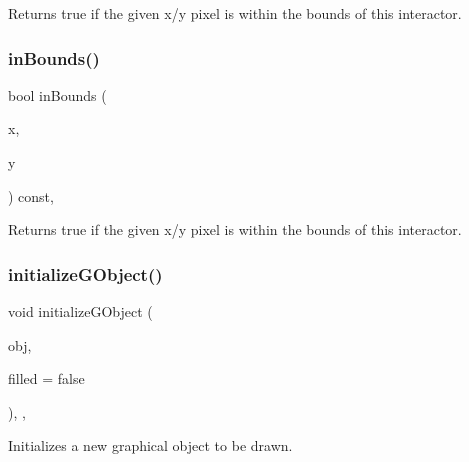 Returns true if the given x/y pixel is within the bounds of this interactor. 

\mbox{\label{classsgl_1_1GInteractor_ae6d7982c1c627b677a5e776ca86118ed}} 
\subsubsection{\texorpdfstring{in\+Bounds()}{inBounds()}\hspace{0.1cm}{\footnotesize\ttfamily [2/2]}}
{\footnotesize\ttfamily bool in\+Bounds (\begin{DoxyParamCaption}\item[{int}]{x,  }\item[{int}]{y }\end{DoxyParamCaption}) const\hspace{0.3cm}{\ttfamily [virtual]}, {\ttfamily [inherited]}}



Returns true if the given x/y pixel is within the bounds of this interactor. 

\mbox{\label{classsgl_1_1GDrawingSurface_a814498efebc5586645159cd22990cf61}} 
\subsubsection{\texorpdfstring{initialize\+G\+Object()}{initializeGObject()}\hspace{0.1cm}{\footnotesize\ttfamily [1/2]}}
{\footnotesize\ttfamily void initialize\+G\+Object (\begin{DoxyParamCaption}\item[{\mbox{\hyperlink{classsgl_1_1GObject}{G\+Object}} \&}]{obj,  }\item[{bool}]{filled = {\ttfamily false} }\end{DoxyParamCaption})\hspace{0.3cm}{\ttfamily [protected]}, {\ttfamily [virtual]}, {\ttfamily [inherited]}}



Initializes a new graphical object to be drawn. 

